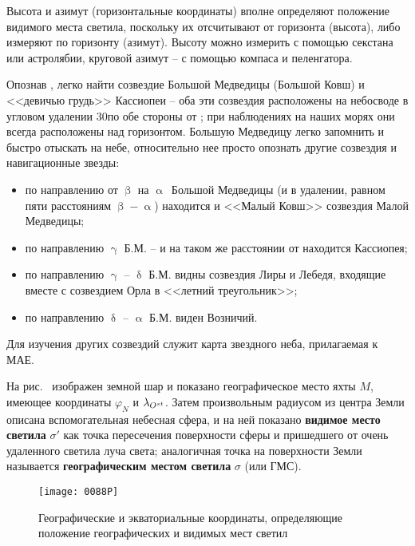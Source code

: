 Высота и азимут (горизонтальные координаты) вполне определяют
положение видимого места светила, поскольку их отсчитывают от
горизонта (высота), либо измеряют по горизонту (азимут). Высоту можно
измерить с помощью секстана или астролябии, круговой азимут \--- с
помощью компаса и пеленгатора.

Опознав , легко найти созвездие Большой Медведицы
(Большой Ковш) и <<девичью грудь>> Кассиопеи \--- оба эти созвездия
расположены на небосводе в угловом удалении 30\gr по обе
стороны от ; при наблюдениях на наших морях они
всегда расположены над горизонтом. Большую Медведицу легко запомнить и
быстро отыскать на небе, относительно нее просто опознать другие
созвездия и навигационные звезды:

\begin{itemize}
\item по направлению от $\upbeta$ на $\upalpha$~Большой Медведицы (и в
  удалении, равном пяти расстояниям $\upbeta - \upalpha$) находится
   и <<Малый Ковш>> созвездия Малой Медведицы;
\item по направлению $\upgamma$ Б.М. \---  и на
  таком же расстоянии от  находится Кассиопея;
\item по направлению $\upgamma$ \--- $\updelta$ Б.М. видны созвездия
  Лиры и Лебедя, входящие вместе с созвездием Орла в <<летний
  треугольник>>;
\item по направлению $\updelta$ \--- $\upalpha$ Б.М. виден Возничий.
\end{itemize}

Для изучения других созвездий служит карта звездного неба, прилагаемая к МАЕ.

На рис.~ изображен земной шар и показано географическое место
яхты $M$, имеющее координаты $\varphi_N$ и $\lambda_{O^{st}}$. Затем
произвольным радиусом из центра Земли описана вспомогательная небесная
сфера, и на ней показано \textbf{видимое место светила} $\sigma'$ как
точка пересечения поверхности сферы и пришедшего от очень удаленного
светила луча света; аналогичная точка на поверхности Земли называется
\textbf{географическим местом светила} $\sigma$ (или ГМС).

\begin{figure}[!htb]
  \centering{}
  \texttt{[image: 0088P]}
  \caption{Географические и экваториальные координаты, определяющие
    положение географических и видимых мест светил}
  \label{fig:88}
\end{figure}

